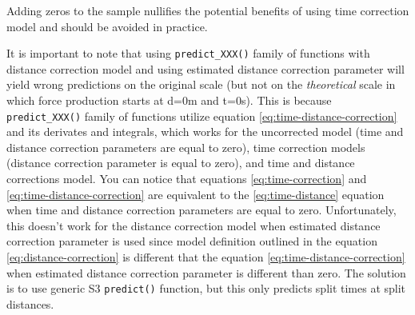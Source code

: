 \documentclass[fleqn,10pt]{wlpeerj} %
\begin{document}
\normalsize

Adding zeros to the sample nullifies the potential benefits of using time correction model and should be avoided in practice.

It is important to note that using \texttt{predict\_XXX()} family of functions with distance correction model and using estimated distance correction parameter will yield wrong predictions on the original scale (but not on the \emph{theoretical} scale in which force production starts at d=0m and t=0s). This is because \texttt{predict\_XXX()} family of functions utilize equation \eqref{eq:time-distance-correction} and its derivates and integrals, which works for the uncorrected model (time and distance correction parameters are equal to zero), time correction models (distance correction parameter is equal to zero), and time and distance corrections model. You can notice that equations \eqref{eq:time-correction} and \eqref{eq:time-distance-correction} are equivalent to the \eqref{eq:time-distance} equation when time and distance correction parameters are equal to zero. Unfortunately, this doesn't work for the distance correction model when estimated distance correction parameter is used since model definition outlined in the equation \eqref{eq:distance-correction} is different that the equation \eqref{eq:time-distance-correction} when estimated distance correction parameter is different than zero. The solution is to use generic S3 \texttt{predict()} function, but this only predicts split times at split distances.

\small
\end{document}
